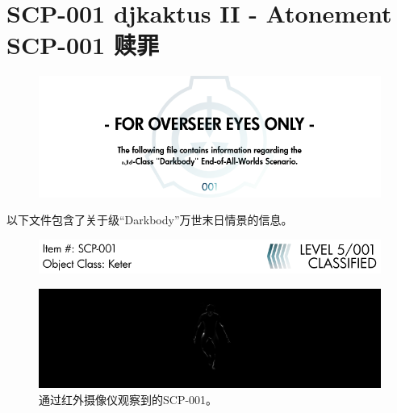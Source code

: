 \chapter[SCP-001 赎罪]{
    SCP-001 djkaktus II - Atonement\\
    SCP-001 赎罪
}

\label{chap:SCP-001.atonement}

\begin{center}

\begin{figure}[H]
    \centering
    \includegraphics[width=\linewidth]{images/SCP-001-atonement.png}
\end{figure}


以下文件包含了关于级“Darkbody”万世末日情景的信息。



\end{center}

\newpage

\begin{figure}[H]
    \centering
    \includegraphics[width=\linewidth]{images/SCP-001-atonement-2.png}
\end{figure}

\begin{figure}[H]
    \centering
    \includegraphics[width=\linewidth]{images/SCP-001-atonement-3.jpg}
    \caption*{通过红外摄像仪观察到的SCP-001。}
\end{figure}

